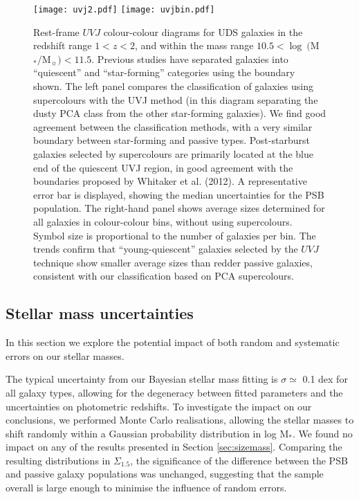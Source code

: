 \documentclass[a4paper,fleqn,usenatbib,useAMS]{mnras}
\begin{document}
\begin{figure*}
	\texttt{[image: uvj2.pdf]}
	\texttt{[image: uvjbin.pdf]}
    \caption{Rest-frame $UVJ$ colour-colour diagrams for UDS galaxies
      in the redshift range $1<z<2$, and within the mass range $10.5<
      \log ~($M$_{*}/$M$_{\sun})<11.5$. Previous studies have
      separated galaxies into ``quiescent'' and ``star-forming''
      categories using the boundary shown. The left panel compares the
      classification of galaxies using supercolours with the UVJ
      method (in this diagram separating the dusty PCA class from
      the other star-forming galaxies). We find good agreement between the classification methods, with a very similar
      boundary between star-forming and passive types.  Post-starburst
      galaxies selected by supercolours are primarily located at the
      blue end of the quiescent UVJ region, in good agreement with
      the boundaries proposed by Whitaker et al. (2012). A
      representative error bar is displayed, showing the median
      uncertainties for the PSB population.  The right-hand panel
      shows average sizes determined for all galaxies in colour-colour
      bins, without using supercolours. Symbol size is proportional to
      the number of galaxies per bin.  The trends confirm that
      ``young-quiescent'' galaxies selected by the $UVJ$ technique
      show smaller average sizes than redder passive galaxies,
      consistent with our classification based on PCA supercolours.}
    \label{fig:uvjfig}
\end{figure*}

\subsection{Stellar mass uncertainties}
\label{sec:uncertainties}

In this section we explore the potential impact of both random and
systematic errors on our stellar masses. 

The typical uncertainty from our Bayesian stellar mass fitting is
$\sigma \simeq$ 0.1 dex  for all galaxy types,
allowing for the degeneracy between fitted parameters and the
uncertainties on photometric redshifts. To investigate the impact on
our conclusions, we performed Monte Carlo realisations, allowing the
stellar masses to shift randomly within a Gaussian probability
distribution in log M$_{\ast}$. We found no impact on any of the
results presented in Section \ref{sec:sizemass}.  Comparing the
resulting distributions in $\Sigma_{1.5}$, the significance of the
difference between the PSB and passive galaxy populations was
unchanged, suggesting that the sample overall is large enough to
minimise the influence of random errors.
\end{document}

